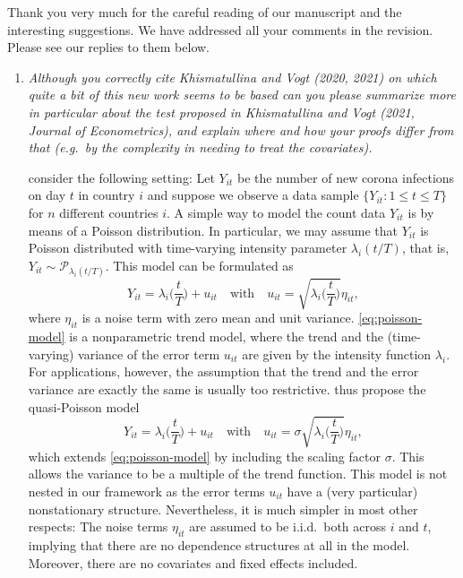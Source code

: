\documentclass[a4paper,12pt]{article}
\begin{document}
Thank you very much for the careful reading of our manuscript and the interesting suggestions. We have addressed all your comments in the revision. Please see our replies to them below.
\begin{enumerate}[label=\arabic*.,leftmargin=0.6cm]

  
\item \textit{Although you correctly cite Khismatullina and Vogt (2020, 2021) on which quite a bit of this new work seems to be based can you please summarize more in particular about the test proposed in Khismatullina and Vogt (2021, Journal of Econometrics), and explain where and how your proofs differ from that (e.g.\ by the complexity in needing to treat the covariates).}

\cite{KhismatullinaVogt2023} consider the following setting: Let $Y_{it}$ be the number of new corona infections on day $t$ in country $i$ and suppose we observe a data sample $\{Y_{it}: 1 \le t \le T \}$ for $n$ different countries $i$. A simple way to model the count data $Y_{it}$ is by means of a Poisson distribution. In particular, we may assume that $Y_{it}$ is Poisson distributed with time-varying intensity parameter $\lambda_i(t/T)$, that is, $Y_{it} \sim \mathcal{P}_{\lambda_i(t/T)}$. This model can be formulated as
\begin{equation}\label{eq:poisson-model}
Y_{it} = \lambda_i\Big(\frac{t}{T}\Big) + u_{it} \quad \text{with} \quad u_{it} = \sqrt{ \lambda_i\Big(\frac{t}{T}\Big) } \eta_{it}, 
\end{equation}
where $\eta_{it}$ is a noise term with zero mean and unit variance. \eqref{eq:poisson-model} is a nonparametric trend model, where the trend and the (time-varying) variance of the error term $u_{it}$ are given by the intensity function $\lambda_i$. For applications, however, the assumption that the trend and the error variance are exactly the same is usually too restrictive. \cite{KhismatullinaVogt2023} thus propose the quasi-Poisson model 
\begin{equation}\label{eq:quasi-poisson-model}
Y_{it} = \lambda_i\Big(\frac{t}{T}\Big) + u_{it} \quad \text{with} \quad u_{it} = \sigma \sqrt{ \lambda_i\Big(\frac{t}{T}\Big) } \eta_{it}, 
\end{equation}
which extends \eqref{eq:poisson-model} by including the scaling factor $\sigma$. This allows the variance to be a multiple of the trend function. This model is not nested in our framework as the error terms $u_{it}$ have a (very particular) nonstationary structure. Nevertheless, it is much simpler in most other respects: The noise terms $\eta_{it}$ are assumed to be i.i.d.\ both across $i$ and $t$, implying that there are no dependence structures at all in the model. Moreover, there are no covariates and fixed effects included. \\

\end{enumerate}
\end{document}
